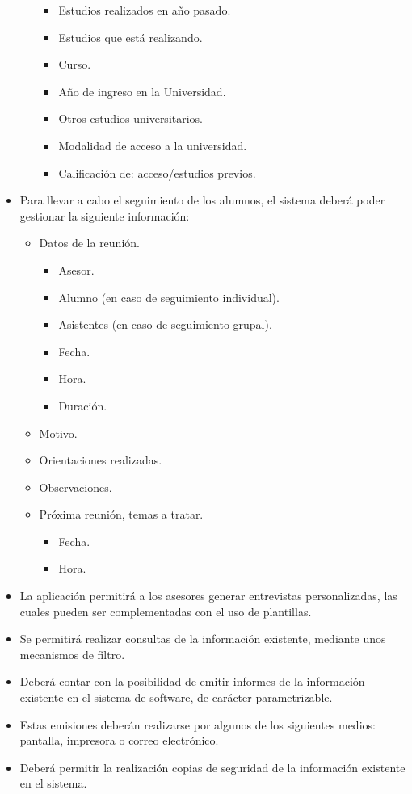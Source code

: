 \begin{itemize}
\begin{itemize}
      \begin{itemize}
         \item Estudios realizados en año pasado.
         \item Estudios que está realizando.
         \item Curso.
         \item Año de ingreso en la Universidad.
         \item Otros estudios universitarios.
         \item Modalidad de acceso a la universidad.
         \item Calificación de: acceso/estudios previos.
      \end{itemize}
   \end{itemize}
   \item Para llevar a cabo el seguimiento de los alumnos, el sistema deberá
   poder gestionar la siguiente información:
   \begin{itemize}
      \item Datos de la reunión.
      \begin{itemize}
         \item Asesor.
         \item Alumno (en caso de seguimiento individual).
         \item Asistentes (en caso de seguimiento grupal).
         \item Fecha.
         \item Hora.
         \item Duración.
      \end{itemize}
      \item Motivo.
      \item Orientaciones realizadas.
      \item Observaciones.
      \item Próxima reunión, temas a tratar.
      \begin{itemize}
         \item Fecha.
         \item Hora.
      \end{itemize}
   \end{itemize}
   \item La aplicación permitirá a los asesores generar entrevistas
   personalizadas, las cuales pueden ser complementadas con el uso de
   plantillas.
   \item Se permitirá realizar consultas de la información existente,
   mediante unos mecanismos de filtro.
   \item Deberá contar con la posibilidad de emitir informes de la
   información existente en el sistema de software, de carácter parametrizable.
   \item Estas emisiones deberán realizarse por algunos de los siguientes
   medios: pantalla, impresora o correo electrónico.
   \item Deberá permitir la realización copias de seguridad de la
   información existente en el sistema.
\end{itemize}
